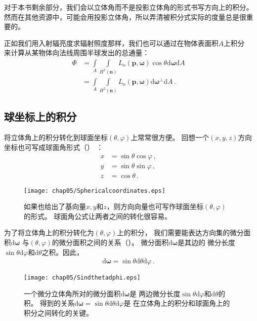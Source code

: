 对于本书剩余部分，我们会以立体角而不是投影立体角的形式书写方向上的积分。
然而在其他资源中，可能会用投影立体角，所以弄清被积分式实际的度量总是很重要的。

正如我们用入射辐亮度求辐射照度那样，我们也可以通过在物体表面积$A$上积分
来计算从某物体向法线周围半球发出的总通量：
\begin{align*}
    \varPhi & =\int\limits_A{\int\limits_{H^2({\bm n})}L_{\mathrm{o}}({\bm p},{\bm\omega})\cos\theta\mathrm{d}{\bm\omega}\mathrm{d}A}   \\
            & =\int\limits_A{\int\limits_{H^2({\bm n})}L_{\mathrm{o}}({\bm p},{\bm\omega})\mathrm{d}{\bm\omega}^{\perp}\mathrm{d}A}\, .
\end{align*}

\subsection{球坐标上的积分}\label{sub:球坐标上的积分}
将立体角上的积分转化到球面坐标$(\theta,\varphi)$上常常很方便。
回想一个$(x,y,z)$方向坐标也可写成球面角形式（）
：
\begin{align*}
    x & =\sin\theta\cos\varphi\, , \\
    y & =\sin\theta\sin\varphi\, , \\
    z & =\cos\theta\, .
\end{align*}
\begin{figure}[htbp]
    \centering\texttt{[image: chap05/Sphericalcoordinates.eps]}
    \caption{如果也给出了基向量$x,y$和$z$，则方向向量也可写作球面坐标$(\theta,\varphi)$的形式。
        球面角公式让两者之间的转化很容易。}
    \label{fig:5.14}
\end{figure}

为了将立体角上的积分转化为$(\theta,\varphi)$上的积分，
我们需要能表达方向集的微分面积$\mathrm{d}\bm\omega$
与$(\theta,\varphi)$的微分面积之间的关系（）。
微分面积$\mathrm{d}\bm\omega$是其边的
微分长度$\sin\theta\mathrm{d}\varphi$和$\mathrm{d}\theta$之积。因此，
\begin{align}\label{eq:5.5}
    \mathrm{d}{\bm\omega}=\sin\theta\mathrm{d}\theta\mathrm{d}\varphi\, .
\end{align}
\begin{figure}[htbp]
    \centering\texttt{[image: chap05/Sindthetadphi.eps]}
    \caption{一个微分立体角所对的微分面积$\mathrm{d}\bm\omega$是
        两边微分长度$\sin\theta\mathrm{d}\varphi$和$\mathrm{d}\theta$的积。
        得到的关系$\mathrm{d}{\bm\omega}=\sin\theta\mathrm{d}\theta\mathrm{d}\varphi$是
        在立体角上的积分和球面角上的积分之间转化的关键。}
    \label{fig:5.15}
\end{figure}


